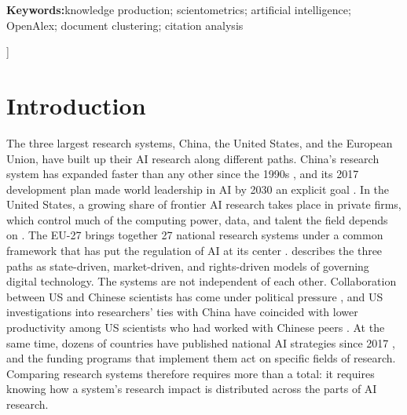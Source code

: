 \documentclass[10pt,twocolumn,a4paper]{article}
\begin{document}
{\begin{center}
\begin{minipage}{0.88\textwidth}
				\medskip
				\noindent\textbf{Keywords:}\enspace knowledge production; scientometrics; artificial intelligence; OpenAlex; document clustering; citation analysis
			\end{minipage}
		\end{center}
		\vspace{1.8em}
	}]
	
	\section{Introduction}
	\label{sec:introduction}
	
	The three largest research systems, China, the United States, and the European Union, have built up their AI research along different paths. China's research system has expanded faster than any other since the 1990s \parencite{zhou2006emergence,xie2014china,marginson2022all}, and its 2017 development plan made world leadership in AI by 2030 an explicit goal \parencite{roberts2021chinese}. In the United States, a growing share of frontier AI research takes place in private firms, which control much of the computing power, data, and talent the field depends on \parencite{ahmed2023growing}. The EU-27 brings together 27 national research systems under a common framework that has put the regulation of AI at its center \parencite{balcioglu2025turning}. \textcite{bradford2023digital} describes the three paths as state-driven, market-driven, and rights-driven models of governing digital technology. The systems are not independent of each other. Collaboration between US and Chinese scientists has come under political pressure \parencite{marginson2022all}, and US investigations into researchers' ties with China have coincided with lower productivity among US scientists who had worked with Chinese peers \parencite{jia2024impact}. At the same time, dozens of countries have published national AI strategies since 2017 \parencite{fatima2020national,radu2021steering}, and the funding programs that implement them act on specific fields of research. Comparing research systems therefore requires more than a total: it requires knowing how a system's research impact is distributed across the parts of AI research.
	
\end{document}
